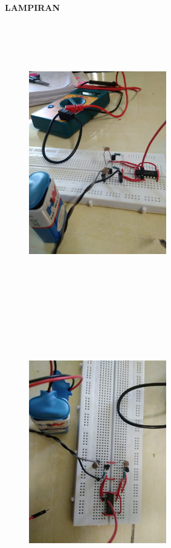 \documentclass[12pt,a4paper]{article}
\begin{document}
\newpage
\begin{center}
\large{\textbf{LAMPIRAN}}
\end{center}

\newpage
\begin{figure}
\paragraph{ }
\begin{center}
\includegraphics[width=6cm, height=12cm]{g1.png}
\end{center}
\paragraph{ }
\begin{center}
\includegraphics[width=6cm, height=12cm]{g2.png}
\end{center}
\end{figure}
\vspace{2cm}
\end{document}
